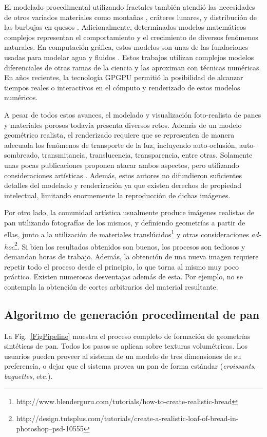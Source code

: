 El modelado procedimental utilizando fractales también atendió las necesidades de otros variados materiales como montañas \cite{Prusinkiewicz1993}, cráteres lunares, y distribución de las burbujas en quesos \cite{Mandelbrot1983}. 
Adicionalmente, determinados modelos matemáticos complejos representan el comportamiento y el crecimiento de diversos fenómenos naturales.
En computación gráfica, estos modelos son unas de las fundaciones usadas para modelar agua y fluidos \cite{Stam1999,Fedkiw2001}.
Estos trabajos utilizan complejos modelos diferenciales de otras ramas de la ciencia y las aproximan con técnicas numéricas.
En años recientes, la tecnología GPGPU \cite{Owens2007} permitió la posibilidad de alcanzar tiempos reales o interactivos en el cómputo y renderizado de estos modelos numéricos.

A pesar de todos estos avances, el modelado y visualización foto-realista de panes y materiales porosos todavía presenta diversos retos.
Además de un modelo geométrico realista, el renderizado requiere que se representen de manera adecuada los fenómenos de transporte de la luz, incluyendo auto-oclusión, auto-sombreado, transmitancia, translucencia, transparencia, entre otras.
Solamente unas pocas publicaciones proponen atacar ambos aspectos, pero utilizando consideraciones artísticas \cite{Xenakis2007}.
Además, estos autores no difundieron suficientes detalles del modelado y renderización ya que existen derechos de propiedad intelectual, limitando enormemente la reproducción de dichas imágenes.

Por otro lado, la comunidad artística usualmente produce imágenes realistas de pan utilizando fotografías de los mismos, y definiendo geometrías a partir de ellas, junto a la utilización de materiales translúcidos\footnote{http://www.blenderguru.com/tutorials/how-to-create-realistic-bread} y otras consideraciones {\em ad-hoc}\footnote{http://design.tutsplus.com/tutorials/create-a-realistic-loaf-of-bread-in-photoshop--psd-10555}.
Si bien los resultados obtenidos son buenos, los procesos son tediosos y demandan horas de trabajo.
Además, la obtención de una nueva imagen requiere repetir todo el proceso desde el principio, lo que torna al mismo muy poco práctico.
Existen numerosas desventajas además de esta.
Por ejemplo, no se contempla la obtención de cortes arbitrarios del material resultante.


\subsection{Algoritmo de generación procedimental de pan}
La Fig.~\ref{FigPipeline} muestra el proceso completo de formación de geometrías sintéticas de pan.
Todos los pasos se aplican sobre texturas volumétricas.
Los usuarios pueden proveer al sistema de un modelo de tres dimensiones de su preferencia, o dejar que el sistema provea un pan de forma estándar ({\em croissants}, {\em baguettes}, etc.).

